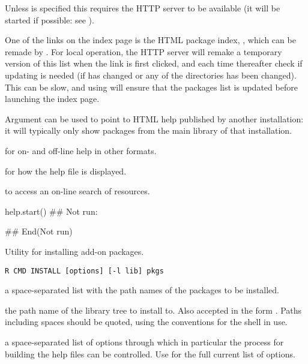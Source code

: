%
\begin{Details}\relax
Unless  is specified this requires the HTTP server to be
available (it will be started if possible: see
).

One of the links on the index page is the HTML package index,
, which can be remade by
.  For local operation,
the HTTP server will remake a temporary version of this list when the
link is first clicked, and each time thereafter check if updating is
needed (if  has changed or any of the
directories has been changed).  This can be slow, and using
 will ensure that the packages list is updated
before launching the index page.

Argument  can be used to point to HTML help published by
another \R{} installation: it will typically only show packages from the
main library of that installation.
\end{Details}
%
\begin{SeeAlso}\relax
{} for on- and off-line help in other formats.

 for how the help file is displayed.

 to access an on-line search of \R{} resources.
\end{SeeAlso}
%
\begin{Examples}
\begin{ExampleCode}
help.start()
## Not run: 

## End(Not run)
\end{ExampleCode}
\end{Examples}
%
\begin{Description}\relax
Utility for installing add-on packages.
\end{Description}
%
\begin{Usage}
\begin{verbatim}
R CMD INSTALL [options] [-l lib] pkgs
\end{verbatim}
\end{Usage}
%
\begin{Arguments}
\begin{ldescription}
\item[\code{pkgs}] a space-separated list with the path names of the packages to be
installed.
\item[\code{lib}] the path name of the \R{} library tree to install to.  Also
accepted in the form .  Paths including spaces should
be quoted, using the conventions for the shell in use.
\item[\code{options}] a space-separated list of options through which in
particular the process for building the help files can be controlled.
Use  for the full current list of options.
\end{ldescription}
\end{Arguments}
